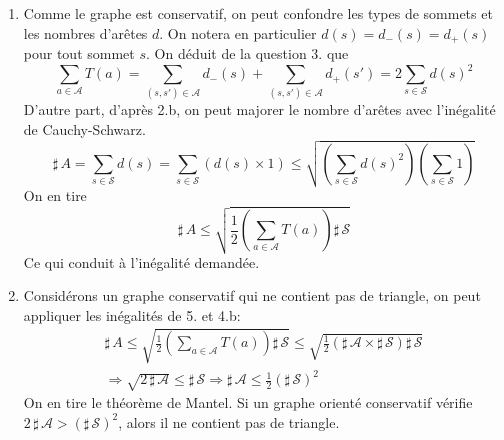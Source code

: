\begin{enumerate}
 \item Comme le graphe est conservatif, on peut confondre les types de sommets et les nombres d'arêtes $d$. On notera en particulier $d(s)=d_-(s)=d_+(s)$ pour tout sommet $s$. On déduit de la question 3. que
\begin{displaymath}
 \sum_{a\in\mathcal A}T(a) =\sum_{(s,s')\in \mathcal A}d_-(s) + \sum_{(s,s')\in \mathcal A}d_+(s')
= 2 \sum_{s\in \mathcal S}d(s)^2
\end{displaymath}
D'autre part, d'après 2.b, on peut majorer le nombre d'arêtes avec l'inégalité de Cauchy-Schwarz.
\begin{displaymath}
 \sharp\, A =\sum_{s\in \mathcal S}d(s) =\sum_{s\in \mathcal S}\left( d(s)\times 1\right) 
\leq
\sqrt{\left( \sum_{s\in \mathcal S}d(s)^2\right) \left( \sum_{s\in \mathcal S} 1\right)}
\end{displaymath}
On en tire
\begin{displaymath}
 \sharp\, A \leq \sqrt{\frac{1}{2}\left( \sum_{a\in\mathcal A}T(a)\right)  \sharp\,\mathcal S}
\end{displaymath}
Ce qui conduit à l'inégalité demandée.

 \item Considérons un graphe conservatif qui ne contient pas de triangle, on peut appliquer les inégalités de 5. et 4.b:
\begin{multline*}
 \sharp\, A \leq \sqrt{\frac{1}{2}\left( \sum_{a\in\mathcal A}T(a)\right)  \sharp\,\mathcal S}
\leq \sqrt{\frac{1}{2} \left( \sharp\, \mathcal A \times \sharp\, \mathcal S\right) \sharp\,\mathcal S}\\
\Rightarrow
\sqrt{2\,\sharp\,\mathcal A} \leq \sharp\,\mathcal S 
\Rightarrow
\sharp\,\mathcal A \leq \frac{1}{2} (\sharp\,\mathcal S)^2
\end{multline*}
On en tire le théorème de Mantel. Si un graphe orienté conservatif vérifie $2\,\sharp\,\mathcal A > (\sharp \,\mathcal S)^2$, alors il ne contient pas de triangle.
\end{enumerate}


